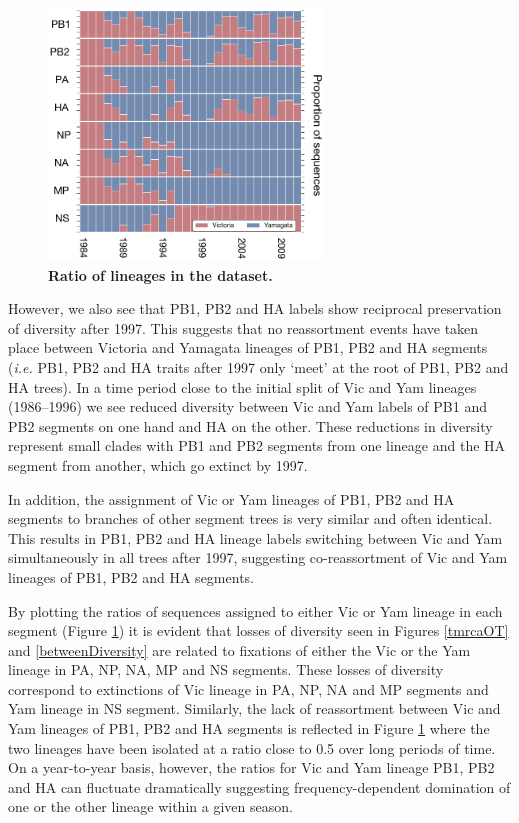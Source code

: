 \documentclass[11pt,oneside,letterpaper]{article}
\begin{document}
\begin{figure}[h]
	\centering	
	\includegraphics[width=0.65\textwidth]	{figures/InfB_LineageRatiosOverTime.png}
	\caption{\textbf{Ratio of lineages in the dataset.}}
	\label{lineageRatiosOverTime}
\end{figure}

However, we also see that PB1, PB2 and HA labels show reciprocal preservation of diversity after 1997.
This suggests that no reassortment events have taken place between Victoria and Yamagata lineages of PB1, PB2 and HA segments (\textit{i.e.} PB1, PB2 and HA traits after 1997 only `meet' at the root of PB1, PB2 and HA trees).
In a time period close to the initial split of Vic and Yam lineages (1986--1996) we see reduced diversity between Vic and Yam labels of PB1 and PB2 segments on one hand and HA on the other.
These reductions in diversity represent small clades with PB1 and PB2 segments from one lineage and the HA segment from another, which go extinct by 1997.

In addition, the assignment of Vic or Yam lineages of PB1, PB2 and HA segments to branches of other segment trees is very similar and often identical.
This results in PB1, PB2 and HA lineage labels switching between Vic and Yam simultaneously in all trees after 1997, suggesting co-reassortment of Vic and Yam lineages of PB1, PB2 and HA segments. 

By plotting the ratios of sequences assigned to either Vic or Yam lineage in each segment (Figure \ref{lineageRatiosOverTime}) it is evident that losses of diversity seen in Figures \ref{tmrcaOT} and \ref{betweenDiversity} are related to fixations of either the Vic or the Yam lineage in PA, NP, NA, MP and NS segments.
These losses of diversity correspond to extinctions of Vic lineage in PA, NP, NA and MP segments and Yam lineage in NS segment.
Similarly, the lack of reassortment between Vic and Yam lineages of PB1, PB2 and HA segments is reflected in Figure \ref{lineageRatiosOverTime} where the two lineages have been isolated at a ratio close to 0.5 over long periods of time.
On a year-to-year basis, however, the ratios for Vic and Yam lineage PB1, PB2 and HA can fluctuate dramatically suggesting frequency-dependent domination of one or the other lineage within a given season.
\end{document}
